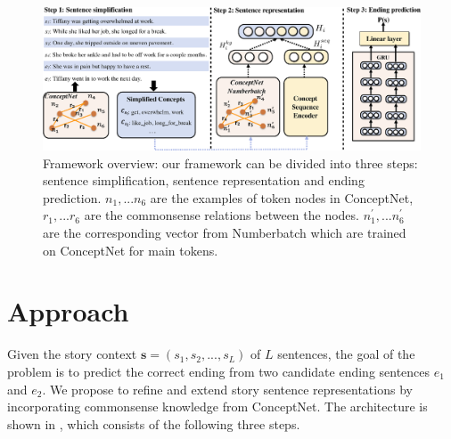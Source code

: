 \begin{figure}[th!]
\centering
\includegraphics[width=2\columnwidth]{pictures/model}
\caption{Framework overview: our framework can be divided into three steps: 
sentence simplification, sentence representation and ending prediction. 
${n_1,...n_6}$ are the examples of token nodes in ConceptNet, 
${r_1,...r_6}$  are the commonsense relations between the nodes. 
${n_1^{'},...n_6^{'}}$ are the corresponding vector from Numberbatch\protect\footnotemark 
which are trained on ConceptNet for main tokens.
}
\label{fig:model}
\end{figure}

\section{Approach}
\label{sec:approach}




Given the story context $\textbf{s} = (s_1, s_2, ..., s_L)$ of $L$ sentences,
the goal of the problem is to predict the correct ending from 
two candidate ending sentences $e_1$ and $e_2$.
We propose to refine and extend story sentence representations
by incorporating commonsense knowledge from ConceptNet.
The architecture is shown in , which consists of 
the following three steps. 

